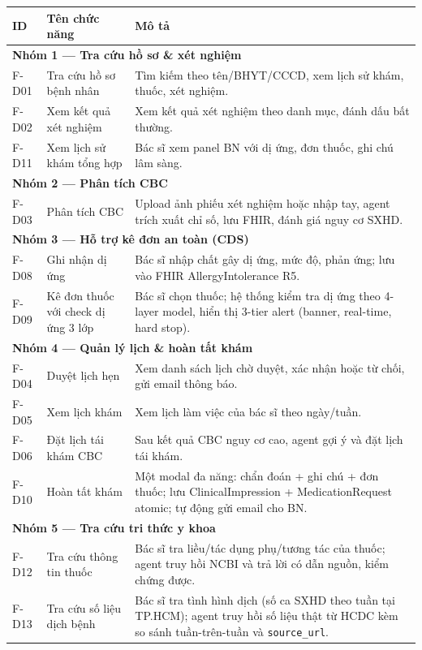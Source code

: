\documentclass[a4paper,13pt,3p,twoside,openany]{report}
\theoremstyle{definition}
\theoremstyle{remark}
\theoremstyle{definition}
\begin{document}
\begin{table}[H]
\centering
\begin{tabular}{|l|p{4cm}|p{8cm}|}
\hline
\textbf{ID} & \textbf{Tên chức năng} & \textbf{Mô tả} \\
\hline
\multicolumn{3}{|l|}{\textbf{Nhóm 1 --- Tra cứu hồ sơ \& xét nghiệm}} \\
\hline
F-D01 & Tra cứu hồ sơ bệnh nhân & Tìm kiếm theo tên/BHYT/CCCD, xem lịch sử khám, thuốc, xét nghiệm. \\
\hline
F-D02 & Xem kết quả xét nghiệm & Xem kết quả xét nghiệm theo danh mục, đánh dấu bất thường. \\
\hline
F-D11 & Xem lịch sử khám tổng hợp & Bác sĩ xem panel BN với dị ứng, đơn thuốc, ghi chú lâm sàng. \\
\hline
\multicolumn{3}{|l|}{\textbf{Nhóm 2 --- Phân tích CBC}} \\
\hline
F-D03 & Phân tích CBC & Upload ảnh phiếu xét nghiệm hoặc nhập tay, agent trích xuất chỉ số, lưu FHIR, đánh giá nguy cơ SXHD. \\
\hline
\multicolumn{3}{|l|}{\textbf{Nhóm 3 --- Hỗ trợ kê đơn an toàn (CDS)}} \\
\hline
F-D08 & Ghi nhận dị ứng & Bác sĩ nhập chất gây dị ứng, mức độ, phản ứng; lưu vào FHIR AllergyIntolerance R5. \\
\hline
F-D09 & Kê đơn thuốc với check dị ứng 3 lớp & Bác sĩ chọn thuốc; hệ thống kiểm tra dị ứng theo 4-layer model, hiển thị 3-tier alert (banner, real-time, hard stop). \\
\hline
\multicolumn{3}{|l|}{\textbf{Nhóm 4 --- Quản lý lịch \& hoàn tất khám}} \\
\hline
F-D04 & Duyệt lịch hẹn & Xem danh sách lịch chờ duyệt, xác nhận hoặc từ chối, gửi email thông báo. \\
\hline
F-D05 & Xem lịch khám & Xem lịch làm việc của bác sĩ theo ngày/tuần. \\
\hline
F-D06 & Đặt lịch tái khám CBC & Sau kết quả CBC nguy cơ cao, agent gợi ý và đặt lịch tái khám. \\
\hline
F-D10 & Hoàn tất khám & Một modal đa năng: chẩn đoán + ghi chú + đơn thuốc; lưu ClinicalImpression + MedicationRequest atomic; tự động gửi email cho BN. \\
\hline
\multicolumn{3}{|l|}{\textbf{Nhóm 5 --- Tra cứu tri thức y khoa}} \\
\hline
F-D12 & Tra cứu thông tin thuốc & Bác sĩ tra liều/tác dụng phụ/tương tác của thuốc; agent truy hồi NCBI và trả lời có dẫn nguồn, kiểm chứng được. \\
\hline
F-D13 & Tra cứu số liệu dịch bệnh & Bác sĩ tra tình hình dịch (số ca SXHD theo tuần tại TP.HCM); agent truy hồi số liệu thật từ HCDC kèm so sánh tuần-trên-tuần và \texttt{source\_url}. \\
\hline
\end{tabular}
\end{table}
\end{document}
